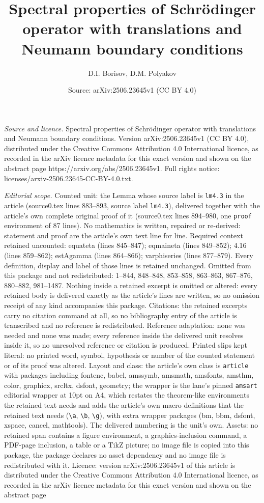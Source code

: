\documentclass[10pt,a4paper]{amsart}
\title[Spectral properties of Schr\"odinger operator with translati]{Spectral properties of Schr\"odinger operator with translations and Neumann boundary conditions}
\author{D.I. Borisov, D.M. Polyakov}
\date{Source: arXiv:2506.23645v1 (CC BY 4.0)}
\begin{document}
\maketitle

\noindent\emph{Source and licence.} Spectral properties of Schr\"odinger operator with translations and Neumann boundary conditions. Version arXiv:2506.23645v1 (CC BY 4.0), distributed under the Creative Commons Attribution 4.0 International licence, as recorded in the arXiv licence metadata for this exact version and shown on the abstract page https://arxiv.org/abs/2506.23645v1. Full rights notice: licenses/arxiv-2506.23645-CC-BY-4.0.txt.\par\smallskip

\noindent\textit{Editorial scope.} Counted unit: the Lemma whose source label is \texttt{lm4.3} in the article (source0.tex lines 883--893, source label \texttt{lm4.3}), delivered together with the article's own complete original proof of it (source0.tex lines 894--980, one \texttt{proof} environment of 87 lines). No mathematics is written, repaired or re-derived: statement and proof are the article's own text line for line. Required context retained uncounted: equateta (lines 845--847); eqmaineta (lines 849--852); 4.16 (lines 859--862); estAgamma (lines 864--866); varphiseries (lines 877--879). Every definition, display and label of those lines is retained unchanged. Omitted from this package and not redistributed: 1--844, 848--848, 853--858, 863--863, 867--876, 880--882, 981--1487. Nothing inside a retained excerpt is omitted or altered: every retained body is delivered exactly as the article's lines are written, so no omission receipt of any kind accompanies this package. Citations: the retained excerpts carry no citation command at all, so no bibliography entry of the article is transcribed and no reference is redistributed. Reference adaptation: none was needed and none was made; every reference inside the delivered unit resolves inside it, so no unresolved reference or citation is produced. Printed slips kept literal: no printed word, symbol, hypothesis or number of the counted statement or of its proof was altered. Layout and class: the article's own class is \texttt{article} with packages including fontenc, babel, amssymb, amsmath, amsfonts, amsthm, color, graphicx, srcltx, dsfont, geometry; the wrapper is the lane's pinned \texttt{amsart} editorial wrapper at 10pt on A4, which restates the theorem-like environments the retained text needs and adds the article's own macro definitions that the retained text needs (\texttt{\textbackslash a}, \texttt{\textbackslash b}, \texttt{\textbackslash g}), with extra wrapper packages (bm, bbm, dsfont, xspace, cancel, mathtools). The delivered numbering is the unit's own. Assets: no retained span contains a figure environment, a graphics-inclusion command, a PDF-page inclusion, a table or a TikZ picture; no image file is copied into this package, the package declares no asset dependency and no image file is redistributed with it. Licence: version arXiv:2506.23645v1 of this article is distributed under the Creative Commons Attribution 4.0 International licence, as recorded in the arXiv licence metadata for this exact version and shown on the abstract page 
\end{document}
